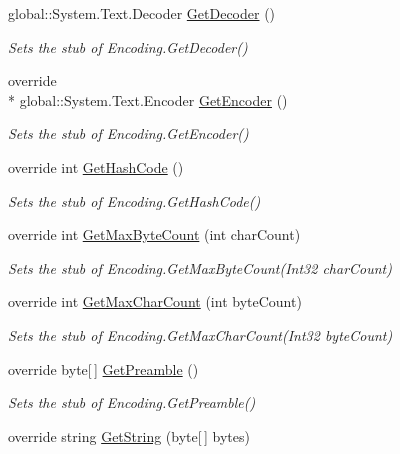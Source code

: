 \begin{DoxyCompactItemize}
global\-::\-System.\-Text.\-Decoder \hyperlink{class_system_1_1_text_1_1_fakes_1_1_stub_encoding_aa4239e4158470c47feb2f292fee41345}{Get\-Decoder} ()
\begin{DoxyCompactList}\small\item\em Sets the stub of Encoding.\-Get\-Decoder()\end{DoxyCompactList}\item 
override \\*
global\-::\-System.\-Text.\-Encoder \hyperlink{class_system_1_1_text_1_1_fakes_1_1_stub_encoding_aafba1b93e92309ab81f2e535377ab0ea}{Get\-Encoder} ()
\begin{DoxyCompactList}\small\item\em Sets the stub of Encoding.\-Get\-Encoder()\end{DoxyCompactList}\item 
override int \hyperlink{class_system_1_1_text_1_1_fakes_1_1_stub_encoding_a88a9abd0b5c30d6bf0d9ef4e5e362ece}{Get\-Hash\-Code} ()
\begin{DoxyCompactList}\small\item\em Sets the stub of Encoding.\-Get\-Hash\-Code()\end{DoxyCompactList}\item 
override int \hyperlink{class_system_1_1_text_1_1_fakes_1_1_stub_encoding_abbeb277e46f8f5c3ef91b91a2d587ed9}{Get\-Max\-Byte\-Count} (int char\-Count)
\begin{DoxyCompactList}\small\item\em Sets the stub of Encoding.\-Get\-Max\-Byte\-Count(\-Int32 char\-Count)\end{DoxyCompactList}\item 
override int \hyperlink{class_system_1_1_text_1_1_fakes_1_1_stub_encoding_a2657458f3ad348aa63bf4cdbc71a203c}{Get\-Max\-Char\-Count} (int byte\-Count)
\begin{DoxyCompactList}\small\item\em Sets the stub of Encoding.\-Get\-Max\-Char\-Count(\-Int32 byte\-Count)\end{DoxyCompactList}\item 
override byte\mbox{[}$\,$\mbox{]} \hyperlink{class_system_1_1_text_1_1_fakes_1_1_stub_encoding_a3c04d6c4f4708b4b389d6b5acd091d26}{Get\-Preamble} ()
\begin{DoxyCompactList}\small\item\em Sets the stub of Encoding.\-Get\-Preamble()\end{DoxyCompactList}\item 
override string \hyperlink{class_system_1_1_text_1_1_fakes_1_1_stub_encoding_a1f38b1f1ad9e8839a91ac47278d2a19e}{Get\-String} (byte\mbox{[}$\,$\mbox{]} bytes)

\end{DoxyCompactItemize}
